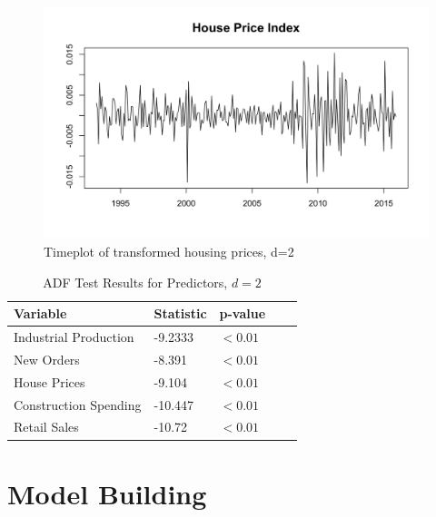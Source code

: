 \documentclass[twoside,twocolumn]{article}
\begin{document}
		
		\begin{figure}[htb]
		\centering
		\caption{Timeplot of transformed housing prices, d=2}
		\label{fig:loghouse}
		\includegraphics[width=\linewidth]{images/houseprice}
	\end{figure}


		 
\begin{table}[htb]
		 \centering
		 \caption{ADF Test Results for Predictors, \(d=2\)}
		 \label{tab:ADF2}
		 \begin{tabular}{lllll}
		 \hline
		 \textbf{Variable} & \textbf{Statistic}  & \textbf{p-value}\\ \hline
		  Industrial Production & -9.2333  &\( < 0.01\)\\
		  New Orders &  -8.391  & \( < 0.01\)\\			  
		  House Prices &  -9.104  & \( < 0.01\)\\				  
		  Construction Spending &  -10.447 &  \( < 0.01\)\\
		  Retail Sales &  -10.72 &  \( < 0.01\)\\ \hline
		 \end{tabular}
		 \end{table}

	 

  



\section{Model Building}
\end{document}
